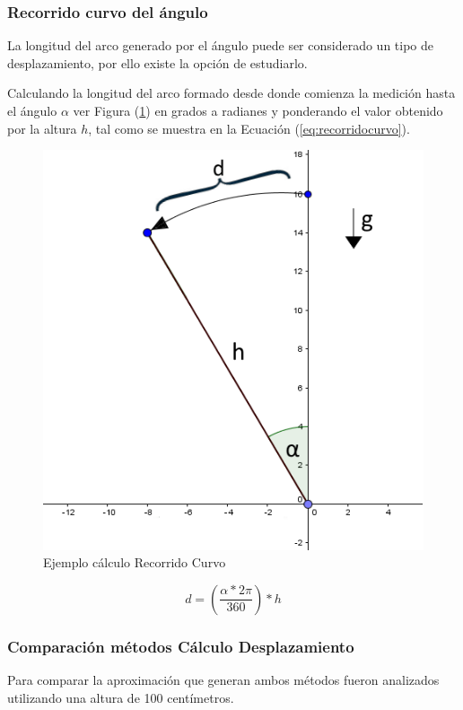 \documentclass[12pt,a4paper]{article}
\begin{document}
\subsubsection{Recorrido curvo del ángulo}
La longitud del arco generado por el ángulo puede ser considerado un tipo de desplazamiento, por ello existe la opción de estudiarlo.

Calculando la longitud del arco formado desde donde comienza la medición hasta el ángulo $\alpha$ ver Figura (\ref{fig:recorridocurvo}) en grados a radianes y ponderando el valor obtenido por la altura $h$, tal como se muestra en la Ecuación (\ref{eq:recorridocurvo}).

\begin{figure}[H]
	\centering
	\includegraphics[scale=0.7]{images/calculoRecorridoCurvo}
	\caption{Ejemplo cálculo Recorrido Curvo}
	\label{fig:recorridocurvo}
\end{figure}

\begin{equation}
	\label{eq:recorridocurvo}
	d=\left(\frac{\alpha*2\pi}{360}\right)*h
\end{equation}

\newpage
\subsubsection{Comparación métodos Cálculo Desplazamiento}
Para comparar la aproximación que generan ambos métodos fueron analizados utilizando una altura de 100 centímetros.
\end{document}
